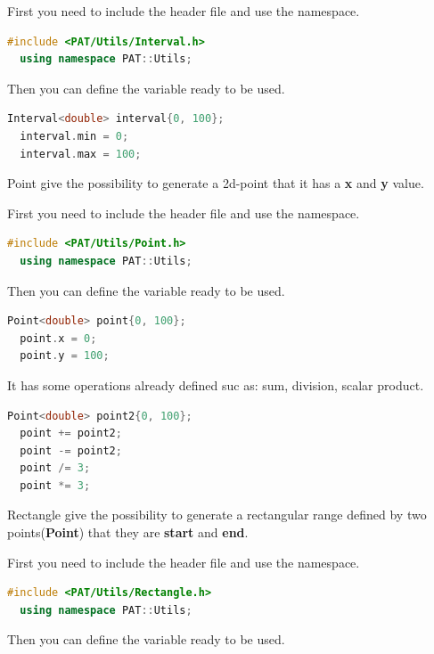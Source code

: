 First you need to include the header file and use the namespace.

\begin{lstlisting}[language=c++, gobble=2]
  #include <PAT/Utils/Interval.h>
  using namespace PAT::Utils;
\end{lstlisting}

Then you can define the variable ready to be used.

\begin{lstlisting}[language=c++, gobble=2]
  Interval<double> interval{0, 100};
  interval.min = 0;
  interval.max = 100;
\end{lstlisting}


Point give the possibility to generate a 2d-point that it has a
\textbf{x} and \textbf{y} value.

First you need to include the header file and use the namespace.

\begin{lstlisting}[language=c++, gobble=2]
  #include <PAT/Utils/Point.h>
  using namespace PAT::Utils;
\end{lstlisting}

Then you can define the variable ready to be used.

\begin{lstlisting}[language=c++, gobble=2]
  Point<double> point{0, 100};
  point.x = 0;
  point.y = 100;  
\end{lstlisting}

It has some operations already defined suc as: sum, division, scalar
product.

\begin{lstlisting}[language=c++, gobble=2]
  Point<double> point2{0, 100};
  point += point2;
  point -= point2;
  point /= 3;
  point *= 3;  
\end{lstlisting}


Rectangle give the possibility to generate a rectangular range defined
by two points(\textbf{Point}) that they are \textbf{start} and
\textbf{end}.

First you need to include the header file and use the namespace.

\begin{lstlisting}[language=c++, gobble=2]
  #include <PAT/Utils/Rectangle.h>
  using namespace PAT::Utils;
\end{lstlisting}

Then you can define the variable ready to be used.

